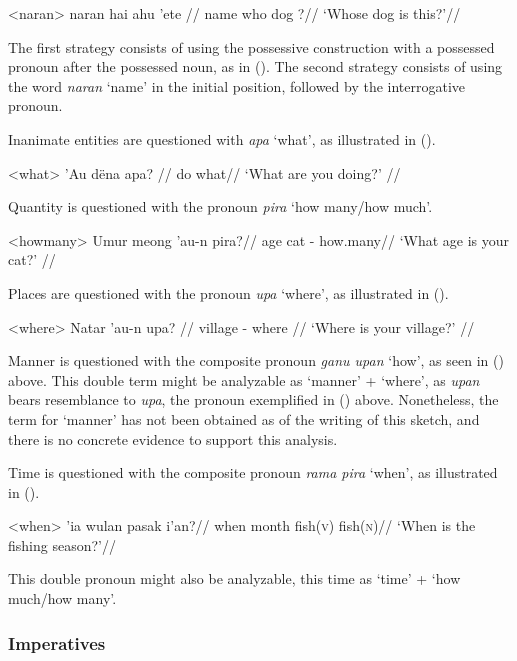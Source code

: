 \documentclass[../hewa_main-subfiles.tex]{subfiles}
\begin{document}
\a<naran> %
\begingl %
\gla naran hai ahu 'ete //
\glb name who dog \Dem{}?//
\glft `Whose dog is this?'// 
\endgl
\xe

The first strategy consists of using the possessive construction with a possessed pronoun after the possessed noun, as in (). The second strategy consists of using the word \textit{naran} `name' in the initial position, followed by the interrogative pronoun.

Inanimate entities are questioned with \textit{apa} `what', as illustrated in ().

\ex<what>
\begingl %
\gla 'Au dëna apa? //
\glb \Second{}\Sg{} do what//
\glft `What are you doing?' // 
\endgl
\xe

Quantity is questioned with the pronoun \textit{pira} `how many/how much'.

\ex<howmany>
\begingl %
\gla Umur meong 'au-n pira?//
\glb age cat \Second{}\Sg{}-\Poss{} how.many//
\glft `What age is your cat?' // 
\endgl 
\xe


Places are questioned with the pronoun \textit{upa} `where', as illustrated in ().

\ex<where>
\begingl %
\gla Natar 'au-n upa? //
\glb village \Second{}\Sg{}-\Poss{} where //
\glft `Where is your village?' // 
\endgl
\xe 

Manner is questioned with the composite pronoun \textit{ganu upan} `how', as seen in () above. This double term might be analyzable as `manner' + `where', as \textit{upan} bears resemblance to \textit{upa}, the pronoun exemplified in () above. Nonetheless, the term for `manner' has not been obtained as of the writing of this sketch, and there is no concrete evidence to support this analysis.

Time is questioned with the composite pronoun \textit{rama pira} `when', as illustrated in ().

\ex<when>
\begingl %
 'ia wulan pasak i'an?//
\glb when \Loc{} month fish(\textsc{v}) fish(\textsc{n})//
\glft `When is the fishing season?'// 
\endgl
\xe

This double pronoun might also be analyzable, this time as `time' + `how much/how many'.

\subsubsection{Imperatives}
\end{document}
